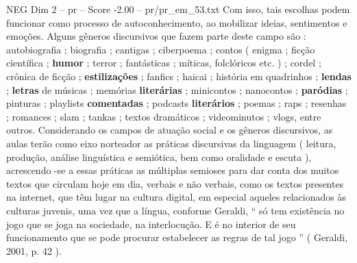 \begin{textsample}{NEG Dim 2 – pr – Score -2.00 – pr/pr\_em\_53.txt}
Com isso, tais escolhas podem funcionar como processo de autoconhecimento, ao mobilizar ideias, sentimentos e emoções.
Alguns gêneros discursivos que fazem parte deste campo são : autobiografia ; biografia ; cantigas ; ciberpoema ; contos ( enigma ; ficção científica ; \textbf{humor} ; terror ; fantásticas ; míticas, folclóricos etc. ) ; cordel ; crônica de ficção ; \textbf{estilizações} ; fanfics ; haicai ; história em quadrinhos ; \textbf{lendas} ; \textbf{letras} de músicas ; memórias \textbf{literárias} ; minicontos ; nanocontos ; \textbf{paródias} ; pinturas ; playlists \textbf{comentadas} ; podcasts \textbf{literários} ; poemas ; raps ; resenhas ; romances ; slam ; tankas ; textos dramáticos ; videominutos ; vlogs, entre outros.
Considerando os campos de atuação social e os gêneros discursivos, as aulas terão como eixo norteador as práticas discursivas da linguagem ( leitura, produção, análise linguística e semiótica, bem como oralidade e escuta ), acrescendo -se a essas práticas as múltiplas semioses para dar conta dos muitos textos que circulam hoje em dia, verbais e não verbais, como os textos presentes na internet, que têm lugar na cultura digital, em especial aqueles relacionados às culturas juvenis, uma vez que a língua, conforme Geraldi, “ só tem existência no jogo que se joga na sociedade, na interlocução.
E é no interior de seu funcionamento que se pode procurar estabelecer as regras de tal jogo ” ( Geraldi, 2001, p. 42 ).

\end{textsample}
